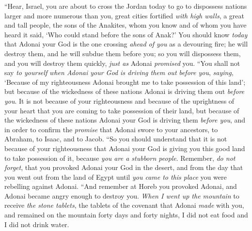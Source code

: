 \begin{biblechapter} %
\verse “Hear, Israel, you are about to cross the Jordan today to go to dispossess nations larger and more numerous than you, great cities fortified \textit{with high walls},
\verse a great and tall people, the sons of the Anakites, whom you know and of whom you have heard it said, ‘Who could stand before the sons of Anak?’
\verse You should know \textit{today} that Adonai your God is the one crossing \textit{ahead of you} as a devouring fire; he will destroy them, and he will subdue them before you; so you will dispossess them, and you will destroy them quickly, \textit{just as} Adonai \textit{promised} you.
\verse “You shall not say \textit{to yourself} \textit{when Adonai your God is driving them out} \textit{before you}, \textit{saying}, ‘Because of my righteousness Adonai brought me to take possession of this land’; but because of the wickedness of these nations Adonai is driving them out \textit{before you}.
\verse It is not because of your righteousness and because of the uprightness of your heart that you are coming to take possession of their land, but because of the wickedness of these nations Adonai your God is driving them \textit{before you}, and in order to confirm the \textit{promise} that Adonai swore to your ancestors, to Abraham, to Isaac, and to Jacob.
\verse “So you should understand that it is not because of your righteousness that Adonai your God is giving you this good land to take possession of it, because \textit{you are a stubborn people}. 
\verse Remember, \textit{do not forget}, that you provoked Adonai your God in the desert, and from the day that you went out from the land of Egypt until \textit{you came to this place} you were rebelling against Adonai.
\verse “And remember at Horeb you provoked Adonai, and Adonai became angry enough to destroy you.
\verse \textit{When I went up the mountain} to receive \textit{the stone tablets}, the tablets of the covenant that Adonai \textit{made} with you, and remained on the mountain forty days and forty nights, I did not eat food and I did not drink water.

\end{biblechapter}
